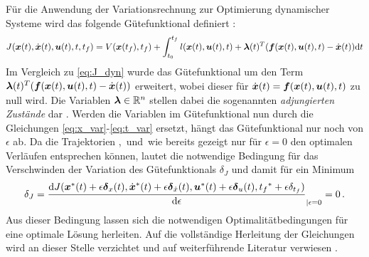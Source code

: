 Für die Anwendung der Variationsrechnung zur Optimierung dynamischer Systeme wird das folgende Gütefunktional definiert \cite{KnutGraichen.2012}:
\begin{equation}
J(\boldsymbol{x}(t),\dot{\boldsymbol{x}}(t),\boldsymbol{u}(t),t,t_f) = V(\boldsymbol{x}(t_f),t_f) + \int_{t_0}^{t_f}l(\boldsymbol{x}(t),\boldsymbol{u}(t),t) + \boldsymbol{\lambda}(t)^T(\boldsymbol{f}(\boldsymbol{x}(t),\boldsymbol{u}(t),t) - \dot{\boldsymbol{x}}(t))\textrm{d}{t} \label{eq:J_var_sys}
\end{equation}
Im Vergleich zu \eqref{eq:J_dyn} wurde das Gütefunktional um den Term $\boldsymbol{\lambda}(t)^T(\boldsymbol{f}(\boldsymbol{x}(t),\boldsymbol{u}(t),t) - \dot{\boldsymbol{x}}(t))$ erweitert, wobei dieser für $\dot{\boldsymbol{x}}(t) = \boldsymbol{f}(\boldsymbol{x}(t),\boldsymbol{u}(t),t)$ zu null wird. Die Variablen $\boldsymbol{\lambda}\in\mathbb{R}^n$ stellen dabei die sogenannten \textit{adjungierten Zustände} dar \cite{KnutGraichen.2012}. Werden die Variablen im Gütefunktional nun durch die Gleichungen \eqref{eq:x_var}-\eqref{eq:t_var} ersetzt, hängt das Gütefunktional nur noch von $\epsilon$ ab. Da die Trajektorien \xoft, \dxoft\,und \uoft\,wie bereits gezeigt nur für $\epsilon=0$ den optimalen Verläufen entsprechen können, lautet die notwendige Bedingung für das Verschwinden der Variation des Gütefunktionals $\delta_J$ und damit für ein Minimum 
\begin{equation}
	\delta_J = \frac{\textrm{d}J({\boldsymbol{x}}^*(t)+\epsilon\boldsymbol{\delta}_{x}(t),\dot{\boldsymbol{x}}^*(t) + \epsilon\boldsymbol{\delta}_{\dot{x}}(t),{\boldsymbol{u}}^*(t) + \epsilon\boldsymbol{\delta}_{u}(t),{t_f}^* + \epsilon\delta_{t_f})}{\textrm{d}{\epsilon}}_{|\epsilon=0}=0\,. \label{eq:VariationJ}
\end{equation}
Aus dieser Bedingung lassen sich die notwendigen Optimalitätbedingungen für eine optimale Lösung herleiten. Auf die vollständige Herleitung der Gleichungen wird an dieser Stelle verzichtet und auf weiterführende Literatur verwiesen \cite{KnutGraichen.2012,Papageorgiou.2012,Gerdts.2010}.

